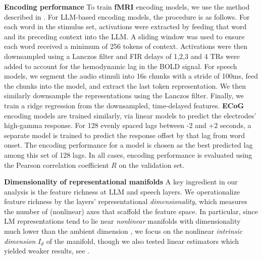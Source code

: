 \documentclass{article}
\theoremstyle{plain}
\theoremstyle{definition}
\theoremstyle{remark}
\newcommand{\mypar}[1]{\textbf{#1}\quad}
\begin{document}
\mypar{Encoding performance}
To train \textbf{fMRI} encoding models, we use the method described in \citet{antonello2023scaling}. For LLM-based encoding models, the procedure is as follows. For each word in the stimulus set, activations were extracted by feeding that word and its  preceding context into the LLM. A sliding window was used to ensure each word received a minimum of 256 tokens of context. Activations were then downsampled using a Lanczos filter and FIR delays of 1,2,3 and 4 TRs were added to account for the hemodynamic lag in the BOLD signal. For speech models, we segment the audio stimuli into 16s chunks with a stride of 100ms, feed the chunks into the model, and extract the last token representation. We then similarly downsample the representations using the Lanczos filter. Finally, we train a ridge regression from the downsampled, time-delayed features. \textbf{ECoG} encoding models are trained similarly, via linear models to predict the electrodes' high-gamma response. For 128 evenly spaced lags between -2 and +2 seconds, a separate model is trained to predict the response offset by that lag from word onset. The encoding performance for a model is chosen as the best predicted lag among this set of 128 lags. In all cases, encoding performance is evaluated using the Pearson correlation coefficient $R$ on the validation set.



\mypar{Dimensionality of representational manifolds} 
A key ingredient in our analysis is the feature richness at LLM and speech layers. We operationalize feature richness by the layers' representational \emph{dimensionality}, which measures the number of (nonlinear) axes that scaffold the feature space. In particular, since LM representations tend to lie near \emph{nonlinear} manifolds with dimensionality much lower than the ambient dimension \citep{cai2021isotropy,Cheng:etal:2023}, we focus on the nonlinear \emph{intrinsic dimension} $I_d$ of the manifold, though we also tested linear estimators which yielded weaker results, see .
\end{document}
